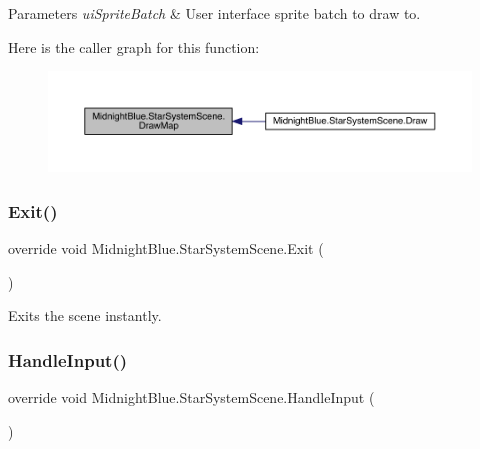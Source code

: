\begin{DoxyParams}{Parameters}
{\em ui\+Sprite\+Batch} & User interface sprite batch to draw to.\\
\hline
\end{DoxyParams}
Here is the caller graph for this function\+:
\nopagebreak
\begin{figure}[H]
\begin{center}
\leavevmode
\includegraphics[width=350pt]{class_midnight_blue_1_1_star_system_scene_a8ce5e552f65d43e0326644e069dc6c24_icgraph}
\end{center}
\end{figure}
\hypertarget{class_midnight_blue_1_1_star_system_scene_ad533ba93e597964d015099031a85cb77}{}\label{class_midnight_blue_1_1_star_system_scene_ad533ba93e597964d015099031a85cb77} 
\subsubsection{\texorpdfstring{Exit()}{Exit()}}
{\footnotesize\ttfamily override void Midnight\+Blue.\+Star\+System\+Scene.\+Exit (\begin{DoxyParamCaption}{ }\end{DoxyParamCaption})\hspace{0.3cm}{\ttfamily [inline]}}



Exits the scene instantly. 

\hypertarget{class_midnight_blue_1_1_star_system_scene_a9fd64901322082a4da8658650257163d}{}\label{class_midnight_blue_1_1_star_system_scene_a9fd64901322082a4da8658650257163d} 
\subsubsection{\texorpdfstring{Handle\+Input()}{HandleInput()}}
{\footnotesize\ttfamily override void Midnight\+Blue.\+Star\+System\+Scene.\+Handle\+Input (\begin{DoxyParamCaption}{ }\end{DoxyParamCaption})\hspace{0.3cm}{\ttfamily [inline]}}



